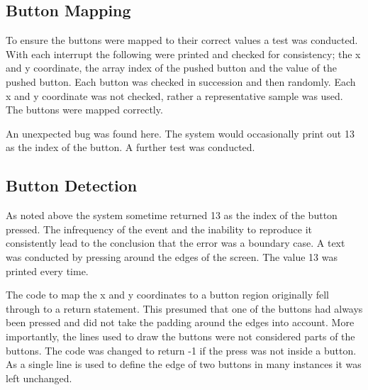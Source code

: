 \documentclass[a4paper, 10pt, titlepage]{article}
\begin{document}
\subsection{Button Mapping}
To ensure the buttons were mapped to their correct values a test was conducted. With each interrupt the following were printed and checked for consistency; the x and y coordinate, the array index of the pushed button and the value of the pushed button. Each button was checked in succession and then randomly. Each x and y coordinate was not checked, rather a representative sample was used. The buttons were mapped correctly.

An unexpected bug was found here. The system would occasionally print out 13 as the index of the button. A further test was conducted.

\subsection{Button Detection}
As noted above the system sometime returned 13 as the index of the button pressed. The infrequency of the event and the inability to reproduce it consistently lead to the conclusion that the error was a boundary case. A text was conducted by pressing around the edges of the screen. The value 13 was printed every time.

The code to map the x and y coordinates to a button region originally fell through to a return statement. This presumed that one of the buttons had always been pressed and did not take the padding around the edges into account. More importantly, the lines used to draw the buttons were not considered parts of the buttons. The code was changed to return -1 if the press was not inside a button. As a single line is used to define the edge of two buttons in many instances it was left unchanged.
\newpage



 
\end{document}

